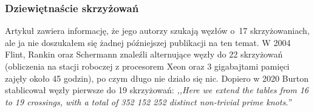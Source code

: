 
\subsubsection{Dziewiętnaście skrzyżowań}
Artykuł \cite{thistlethwaite98} zawiera informację, że jego autorzy szukają węzłów o~17 skrzyżowaniach, ale ja nie doszukałem się żadnej późniejszej publikacji na ten temat.
%
%
%
W 2004 Flint, Rankin oraz Schermann \cite{rankin04} znaleźli alternujące węzły do 22 skrzyżowań (obliczenia na stacji roboczej z procesorem Xeon oraz 3 gigabajtami pamięci zajęły około 45 godzin), po czym długo nie działo się nic.
%
%
%
Dopiero w 2020 Burton \cite{burton20} stablicował węzły pierwsze do 19 skrzyżowań: \emph{,,Here we extend the tables from 16 to 19 crossings, with a total of 352 152 252 distinct non-trivial prime knots.''}
%

